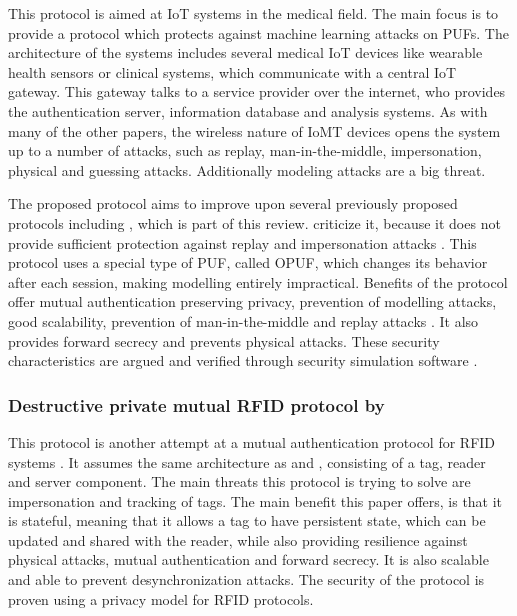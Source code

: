 This protocol is aimed at IoT systems in the medical field.
The main focus is to provide a protocol which protects against machine learning attacks on PUFs.
The architecture of the systems includes several medical IoT devices like wearable health sensors or
clinical systems, which communicate with a central IoT gateway. This gateway talks to a service provider
over the internet, who provides the authentication server, information database and analysis systems.
As with many of the other papers, the wireless nature of \ac{IoMT} devices opens the system up to a
number of attacks, such as replay, man-in-the-middle, impersonation, physical and guessing attacks.
Additionally modeling attacks are a big threat. \cite[][p. 1971f]{Gope2022}

The proposed protocol aims to improve upon several previously proposed protocols including \cite{Majzoobi2012},
which is part of this review. \citeauthor*{Gope2022} criticize it, because it does not provide sufficient protection
against replay and impersonation attacks \cite[][p. 1972]{Gope2022}.
This protocol uses a special type of PUF, called \ac{OPUF}, which changes its behavior after each session,
making modelling entirely impractical.
Benefits of the protocol offer mutual authentication preserving privacy, prevention of modelling attacks,
good scalability, prevention of man-in-the-middle and replay attacks \cite[][p. 1972]{Gope2022}. It also provides forward
secrecy and prevents physical attacks. These security characteristics are argued and verified through security
simulation software \cite[][p. 1979]{Gope2022}.

\subsubsection{Destructive private mutual RFID protocol by \citeauthor*{Hristea2019}}
\label{sec:review_protocol_9}

This protocol is another attempt at a mutual authentication protocol for RFID systems \cite[][p. 331]{Hristea2019}.
It assumes the same architecture as \cite{Zhu2019} and \cite{Gope2018}, consisting of a tag, reader and
server component. The main threats this protocol is trying to solve are impersonation and tracking
of tags. The main benefit this paper offers, is that it is stateful, meaning that it allows a
tag to have persistent state, which can be updated and shared with the reader, while also providing
resilience against physical attacks, mutual authentication and forward secrecy. \cite[][p. 332]{Hristea2019}
It is also scalable and able to prevent desynchronization attacks.
The security of the protocol is proven using a privacy model for RFID protocols. \cite[][p. 340f]{Hristea2019}

